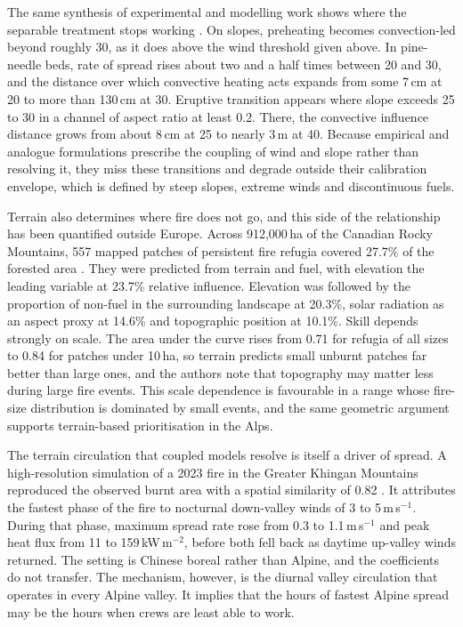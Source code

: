 \documentclass[11pt,a4paper]{article}
\begin{document}
The same synthesis of experimental and modelling work shows where the separable treatment stops working \citep{hayajneh_wind_2026}. On slopes, preheating becomes convection-led beyond roughly 30\degree{}, as it does above the wind threshold given above. In pine-needle beds, rate of spread rises about two and a half times between 20\degree{} and 30\degree{}, and the distance over which convective heating acts expands from some 7\,cm at 20\degree{} to more than 130\,cm at 30\degree{}. Eruptive transition appears where slope exceeds 25\degree{} to 30\degree{} in a channel of aspect ratio at least 0.2. There, the convective influence distance grows from about 8\,cm at 25\degree{} to nearly 3\,m at 40\degree{}. Because empirical and analogue formulations prescribe the coupling of wind and slope rather than resolving it, they miss these transitions and degrade outside their calibration envelope, which is defined by steep slopes, extreme winds and discontinuous fuels.

Terrain also determines where fire does not go, and this side of the relationship has been quantified outside Europe. Across 912{,}000\,ha of the Canadian Rocky Mountains, 557 mapped patches of persistent fire refugia covered 27.7\% of the forested area \citep{rogeau_effect_2018}. They were predicted from terrain and fuel, with elevation the leading variable at 23.7\% relative influence. Elevation was followed by the proportion of non-fuel in the surrounding landscape at 20.3\%, solar radiation as an aspect proxy at 14.6\% and topographic position at 10.1\%. Skill depends strongly on scale. The area under the curve rises from 0.71 for refugia of all sizes to 0.84 for patches under 10\,ha, so terrain predicts small unburnt patches far better than large ones, and the authors note that topography may matter less during large fire events. This scale dependence is favourable in a range whose fire-size distribution is dominated by small events, and the same geometric argument supports terrain-based prioritisation in the Alps.

The terrain circulation that coupled models resolve is itself a driver of spread. A high-resolution simulation of a 2023 fire in the Greater Khingan Mountains reproduced the observed burnt area with a spatial similarity of 0.82 \citep{wang_dynamic_2026}. It attributes the fastest phase of the fire to nocturnal down-valley winds of 3 to 5\,m\,s$^{-1}$. During that phase, maximum spread rate rose from 0.3 to 1.1\,m\,s$^{-1}$ and peak heat flux from 11 to 159\,kW\,m$^{-2}$, before both fell back as daytime up-valley winds returned. The setting is Chinese boreal rather than Alpine, and the coefficients do not transfer. The mechanism, however, is the diurnal valley circulation that operates in every Alpine valley. It implies that the hours of fastest Alpine spread may be the hours when crews are least able to work.
\end{document}
